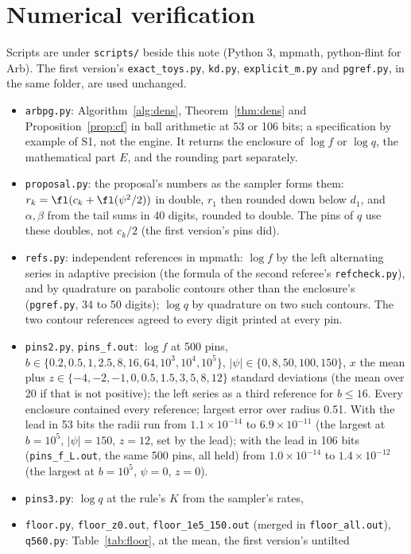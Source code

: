 \section{Numerical verification}\label{app:num}

Scripts are under \texttt{scripts/} beside this note (Python 3, mpmath, python-flint for Arb). The first
version's \texttt{exact\_toys.py}, \texttt{kd.py}, \texttt{explicit\_m.py} and \texttt{pgref.py}, in the same
folder, are used unchanged.
\begin{itemize}
\item \texttt{arbpg.py}: Algorithm~\ref{alg:dens}, Theorem~\ref{thm:dens} and Proposition~\ref{prop:cf} in ball
arithmetic at 53 or 106 bits; a specification by example of S1, not the engine. It returns the enclosure of
$\log f$ or $\log q$, the mathematical part $E$, and the rounding part separately.
\item \texttt{proposal.py}: the proposal's numbers as the sampler forms them: $r_k=\fl(c_k+\fl(\psi^2/2))$ in
double, $r_1$ then rounded down below $d_1$, and $\alpha,\beta$ from the tail sums in 40 digits, rounded to
double. The pins of $q$ use these doubles, not $c_k/2$ (the first version's pins did).
\item \texttt{refs.py}: independent references in mpmath: $\log f$ by the left alternating series in adaptive
precision (the formula of the second referee's \texttt{refcheck.py}), and by quadrature on parabolic contours
other than the enclosure's (\texttt{pgref.py}, 34 to 50 digits); $\log q$ by quadrature on two such contours. The
two contour references agreed to every digit printed at every pin.
\item \texttt{pins2.py}, \texttt{pins\_f.out}: $\log f$ at 500 pins, $b\in\{0.2,0.5,1,2.5,8,16,64,10^3,10^4,10^5\}$,
$|\psi|\in\{0,8,50,100,150\}$, $x$ the mean plus $z\in\{-4,-2,-1,0,0.5,1.5,3,5,8,12\}$ standard deviations
(the mean over 20 if that is not positive); the left series as a third reference for $b\le16$. Every enclosure
contained every reference; largest error over radius 0.51. With the lead in 53 bits the radii run from
$1.1\times10^{-14}$ to $6.9\times10^{-11}$ (the largest at $b=10^5$, $|\psi|=150$, $z=12$, set by the lead); with
the lead in 106 bits (\texttt{pins\_f\_L.out}, the same 500 pins, all held) from $1.0\times10^{-14}$ to
$1.4\times10^{-12}$ (the largest at $b=10^5$, $\psi=0$, $z=0$).
\item \texttt{pins3.py}: $\log q$ at the rule's $K$ from the sampler's rates, \QPINS
\item \texttt{floor.py}, \texttt{floor\_z0.out}, \texttt{floor\_1e5\_150.out} (merged in \texttt{floor\_all.out}), \texttt{q560.py}: Table~\ref{tab:floor}, at the mean, the first version's untilted

\end{itemize}
